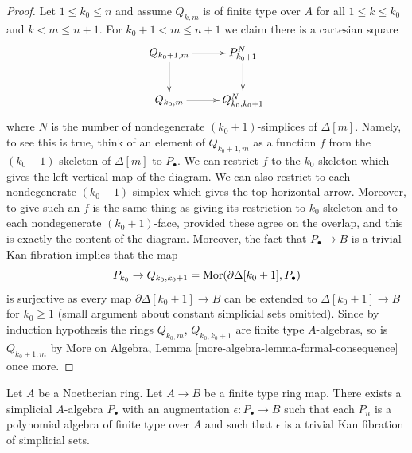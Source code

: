 \begin{proof}
\medskip\noindent
Let $1 \leq k_0 \leq n$ and assume $Q_{k, m}$ is of finite type
over $A$ for all $1 \leq k \leq k_0$ and $k < m \leq n + 1$.
For $k_0 + 1 < m \leq n + 1$ we claim there is a cartesian square
$$
\xymatrix{
Q_{k_0 + 1, m} \ar[d] \ar[r] & P_{k_0 + 1}^N \ar[d] \\
Q_{k_0, m} \ar[r] & Q_{k_0, k_0 + 1}^N
}
$$
where $N$ is the number of nondegenerate $(k_0 + 1)$-simplices
of $\Delta[m]$. Namely, to see this is true, think of an element of
$Q_{k_0 + 1, m}$ as a function $f$ from the $(k_0 + 1)$-skeleton
of $\Delta[m]$ to $P_\bullet$. We can restrict $f$ to the $k_0$-skeleton
which gives the left vertical map of the diagram. We can also restrict
to each nondegenerate $(k_0 + 1)$-simplex which gives the top horizontal
arrow. Moreover, to give such an $f$ is the same thing as giving its
restriction to $k_0$-skeleton and to each nondegenerate
$(k_0 + 1)$-face, provided these agree on the overlap, and this
is exactly the content of the diagram. Moreover, the fact that
$P_\bullet \to B$ is a trivial Kan fibration implies that
the map
$$
P_{k_0} \to Q_{k_0, k_0 + 1} = \mathop{\mathrm{Mor}}\nolimits(\partial \Delta[k_0 + 1], P_\bullet)
$$
is surjective as every map $\partial \Delta[k_0 + 1] \to B$ can be extended
to $\Delta[k_0 + 1] \to B$ for $k_0 \geq 1$ (small argument about constant
simplicial sets omitted). Since by induction hypothesis the rings
$Q_{k_0, m}$, $Q_{k_0, k_0 + 1}$ are finite type $A$-algebras, so is
$Q_{k_0 + 1, m}$ by
More on Algebra, Lemma \ref{more-algebra-lemma-formal-consequence}
once more.
\end{proof}

\begin{proposition}
\label{proposition-polynomial}
Let $A$ be a Noetherian ring. Let $A \to B$ be a finite type ring map.
There exists a simplicial $A$-algebra $P_\bullet$ with an augmentation
$\epsilon : P_\bullet \to B$ such that each $P_n$ is a polynomial algebra
of finite type over $A$ and such that $\epsilon$ is a trivial
Kan fibration of simplicial sets.
\end{proposition}


